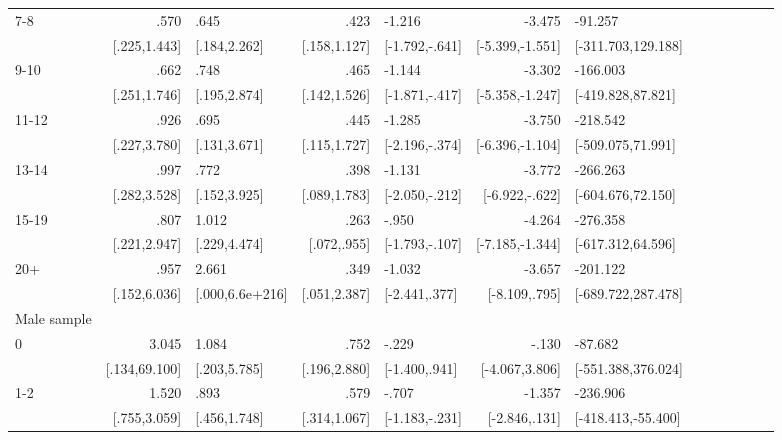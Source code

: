 \begin{table}[hp]
\begin{adjustbox}{max width=\linewidth}
\begin{threeparttable}
{\begin{tabular}{l*{6}{D{.}{.}{-1}l}}
7-8             &            .570&            .645&            .423&          -1.216&          -3.475&         -91.257\\
                &    [.225,1.443]&    [.184,2.262]&    [.158,1.127]&  [-1.792,-.641]& [-5.399,-1.551]&[-311.703,129.188]\\

9-10            &            .662&            .748&            .465&          -1.144&          -3.302&        -166.003\\
                &    [.251,1.746]&    [.195,2.874]&    [.142,1.526]&  [-1.871,-.417]& [-5.358,-1.247]&[-419.828,87.821]\\

11-12           &            .926&            .695&            .445&          -1.285&          -3.750&        -218.542\\
                &    [.227,3.780]&    [.131,3.671]&    [.115,1.727]&  [-2.196,-.374]& [-6.396,-1.104]&[-509.075,71.991]\\

13-14           &            .997&            .772&            .398&          -1.131&          -3.772&        -266.263\\
                &    [.282,3.528]&    [.152,3.925]&    [.089,1.783]&  [-2.050,-.212]&  [-6.922,-.622]&[-604.676,72.150]\\

15-19           &            .807&           1.012&            .263&           -.950&          -4.264&        -276.358\\
                &    [.221,2.947]&    [.229,4.474]&     [.072,.955]&  [-1.793,-.107]& [-7.185,-1.344]&[-617.312,64.596]\\

20+             &            .957&           2.661&            .349&          -1.032&          -3.657&        -201.122\\
                &    [.152,6.036]& [.000,6.6e+216]&    [.051,2.387]&   [-2.441,.377]&   [-8.109,.795]&[-689.722,287.478]\\
\midrule
Male sample &&&&&&\\
0               &           3.045&           1.084&            .752&           -.229&           -.130&         -87.682\\
                &   [.134,69.100]&    [.203,5.785]&    [.196,2.880]&   [-1.400,.941]&  [-4.067,3.806]&[-551.388,376.024]\\

1-2             &           1.520&            .893&            .579&           -.707&          -1.357&        -236.906\\
                &    [.755,3.059]&    [.456,1.748]&    [.314,1.067]&  [-1.183,-.231]&   [-2.846,.131]&[-418.413,-55.400]\\


\end{tabular}}
\end{threeparttable}
\end{adjustbox}
\end{table}
